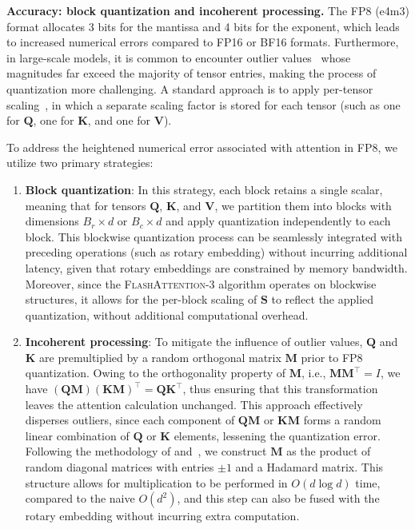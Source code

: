 \begin{enumerate}
\textbf{Accuracy: block quantization and incoherent processing.} The FP8 (e4m3) format allocates 3 bits for the mantissa and 4 bits for the exponent, which leads to increased numerical errors compared to FP16 or BF16 formats. Furthermore, in large-scale models, it is common to encounter outlier values~\citep{dettmers2208llm, sun2024massive} whose magnitudes far exceed the majority of tensor entries, making the process of quantization more challenging. A standard approach is to apply per-tensor scaling~\citep{micikevicius2022fp8}, in which a separate scaling factor is stored for each tensor (such as one for $\mathbf{Q}$, one for $\mathbf{K}$, and one for $\mathbf{V}$). 

To address the heightened numerical error associated with attention in FP8, we utilize two primary strategies:

\begin{enumerate}

\item \textbf{Block quantization}: In this strategy, each block retains a single scalar, meaning that for tensors $\mathbf{Q}$, $\mathbf{K}$, and $\mathbf{V}$, we partition them into blocks with dimensions $B_r \times d$ or $B_c \times d$ and apply quantization independently to each block. This blockwise quantization process can be seamlessly integrated with preceding operations (such as rotary embedding) without incurring additional latency, given that rotary embeddings are constrained by memory bandwidth. Moreover, since the \textsc{FlashAttention-3} algorithm operates on blockwise structures, it allows for the per-block scaling of
$\mathbf{S}$ to reflect the applied quantization, without additional computational overhead.

\item \textbf{Incoherent processing}: To mitigate the influence of outlier values, $\mathbf{Q}$ and $\mathbf{K}$ are premultiplied by a random orthogonal matrix $\mathbf{M}$ prior to FP8 quantization. Owing to the orthogonality property of $\mathbf{M}$, i.e., $\mathbf{M} \mathbf{M}^\top = I$, we have $(\mathbf{Q} \mathbf{M})(\mathbf{K} \mathbf{M})^\top = \mathbf{Q} \mathbf{K}^\top$, thus ensuring that this transformation leaves the attention calculation unchanged. This approach effectively disperses outliers, since each component of $\mathbf{Q} \mathbf{M}$ or $\mathbf{K} \mathbf{M}$ forms a random linear combination of $\mathbf{Q}$ or $\mathbf{K}$ elements, lessening the quantization error. Following the methodology of \citet{chee2024quip} and~\citet{tseng2024quip}, we construct $\mathbf{M}$ as the product of random diagonal matrices with entries $\pm 1$ and a Hadamard matrix. This structure allows for multiplication to be performed in $O(d \log d)$ time, compared to the naive $O(d^2)$, and this step can also be fused with the rotary embedding without incurring extra computation.


\end{enumerate}
\end{enumerate}
